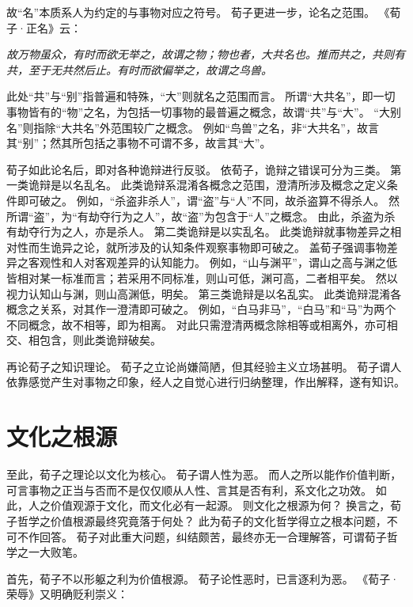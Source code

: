 \documentclass[11pt]{article}
\begin{document}
\newline

故“名”本质系人为约定的与事物对应之符号。
荀子更进一步，论名之范围。
《荀子·正名》云：

\textit{故万物虽众，有时而欲无举之，故谓之物；物也者，大共名也。推而共之，共则有共，至于无共然后止。有时而欲偏举之，故谓之鸟兽。}

此处“共”与“别”指普遍和特殊，“大”则就名之范围而言。
所谓“大共名”，即一切事物皆有的“物”之名，为包括一切事物的最普遍之概念，故谓“共”与“大”。
“大别名”则指除“大共名”外范围较广之概念。
例如“鸟兽”之名，非“大共名”，故言其“别”；然其所包括之事物不可谓不多，故言其“大”。

\newline

荀子如此论名后，即对各种诡辩进行反驳。
依荀子，诡辩之错误可分为三类。
第一类诡辩是以名乱名。
此类诡辩系混淆各概念之范围，澄清所涉及概念之定义条件即可破之。
例如，“杀盗非杀人”，谓“盗”与“人”不同，故杀盗算不得杀人。
然所谓“盗”，为“有劫夺行为之人”，故“盗”为包含于“人”之概念。
由此，杀盗为杀有劫夺行为之人，亦是杀人。
第二类诡辩是以实乱名。
此类诡辩就事物差异之相对性而生诡异之论，就所涉及的认知条件观察事物即可破之。
盖荀子强调事物差异之客观性和人对客观差异的认知能力。
例如，“山与渊平”，谓山之高与渊之低皆相对某一标准而言；若采用不同标准，则山可低，渊可高，二者相平矣。
然以视力认知山与渊，则山高渊低，明矣。
第三类诡辩是以名乱实。
此类诡辩混淆各概念之关系，对其作一澄清即可破之。
例如，“白马非马”，“白马”和“马”为两个不同概念，故不相等，即为相离。
对此只需澄清两概念除相等或相离外，亦可相交、相包含，则此类诡辩破矣。

\newline
再论荀子之知识理论。
荀子之立论尚嫌简陋，但其经验主义立场甚明。
荀子谓人依靠感觉产生对事物之印象，经人之自觉心进行归纳整理，作出解释，遂有知识。

\section{文化之根源}
至此，荀子之理论以文化为核心。
荀子谓人性为恶。
而人之所以能作价值判断，可言事物之正当与否而不是仅仅顺从人性、言其是否有利，系文化之功效。
如此，人之价值观源于文化，而文化必有一起源。
则文化之根源为何？
换言之，荀子哲学之价值根源最终究竟落于何处？
此为荀子的文化哲学得立之根本问题，不可不作回答。
荀子对此重大问题，纠结颇苦，最终亦无一合理解答，可谓荀子哲学之一大败笔。

\newline

首先，荀子不以形躯之利为价值根源。
荀子论性恶时，已言逐利为恶。
《荀子·荣辱》又明确贬利崇义：
\end{document}
